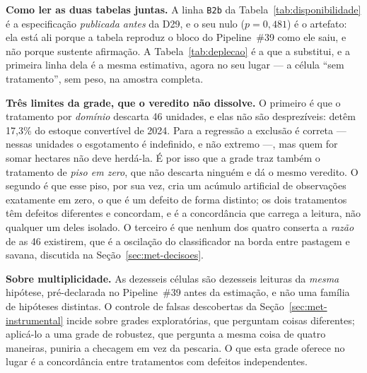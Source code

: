 \textbf{Como ler as duas tabelas juntas.} A linha \texttt{B2b} da
Tabela~\ref{tab:disponibilidade} é a especificação \emph{publicada antes} da
D29, e o seu nulo (\(p = 0{,}481\)) é o artefato: ela está ali porque a tabela
reproduz o bloco do Pipeline~\#39 como ele saiu, e não porque sustente
afirmação. A Tabela~\ref{tab:deplecao} é a que a substitui, e a primeira linha
dela é a mesma estimativa, agora no seu lugar --- a célula ``sem tratamento'',
sem peso, na amostra completa.

\textbf{Três limites da grade, que o veredito não dissolve.} O primeiro é que o
tratamento por \emph{domínio} descarta 46 unidades, e elas não são
desprezíveis: detêm 17,3\% do estoque convertível de 2024. Para a regressão a
exclusão é correta --- nessas unidades o esgotamento é indefinido, e não extremo ---,
mas quem for somar hectares não deve herdá-la. É por isso que a grade traz
também o tratamento de \emph{piso em zero}, que não descarta ninguém e dá o
mesmo veredito. O segundo é que esse piso, por sua vez, cria um acúmulo
artificial de observações exatamente em zero, o que é um defeito de forma
distinto; os dois tratamentos têm defeitos diferentes e concordam, e é a
concordância que carrega a leitura, não qualquer um deles isolado. O terceiro é
que nenhum dos quatro conserta a \emph{razão} de as 46 existirem, que é a
oscilação do classificador na borda entre pastagem e savana, discutida na
Seção~\ref{sec:met-decisoes}.

\textbf{Sobre multiplicidade.} As dezesseis células são dezesseis leituras da
\emph{mesma} hipótese, pré-declarada no Pipeline~\#39 antes da estimação, e não
uma família de hipóteses distintas. O controle de falsas descobertas da
Seção~\ref{sec:met-instrumental} incide sobre grades exploratórias, que
perguntam coisas diferentes; aplicá-lo a uma grade de robustez, que pergunta a
mesma coisa de quatro maneiras, puniria a checagem em vez da pescaria. O que
esta grade oferece no lugar é a concordância entre tratamentos com defeitos
independentes.


